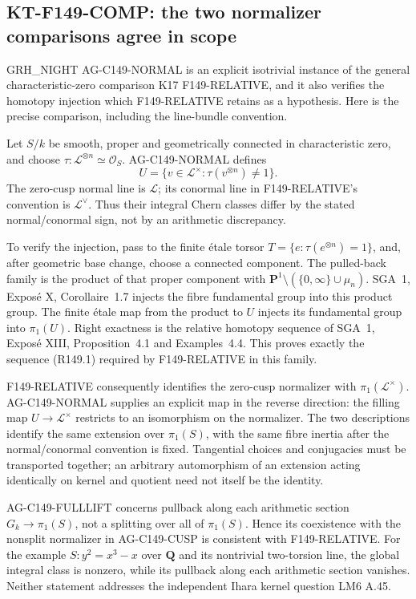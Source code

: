 \subsection{KT-F149-COMP: the two normalizer comparisons agree in scope}
\label{sec:kt-f149-comp}

GRH\_NIGHT AG-C149-NORMAL is an explicit isotrivial instance
of the general characteristic-zero comparison K17
F149-RELATIVE, and it also verifies the homotopy injection
which F149-RELATIVE retains as a hypothesis. Here is the
precise comparison, including the line-bundle convention.

Let $S/k$ be smooth, proper and geometrically connected in
characteristic zero, and choose
$\tau:\mathcal L^{\otimes n}\simeq\mathcal O_S$.
AG-C149-NORMAL defines
\[
 U=\{v\in\mathcal L^\times:
                         \tau(v^{\otimes n})\ne1\}.
\]
The zero-cusp normal line is $\mathcal L$; its conormal
line in F149-RELATIVE's convention is $\mathcal L^\vee$.
Thus their integral Chern classes differ by the stated
normal/conormal sign, not by an arithmetic discrepancy.

To verify the injection, pass to the finite \'etale torsor
$T=\{e:\tau(e^{\otimes n})=1\}$, and, after geometric
base change, choose a connected component. The pulled-back
family is the product of that proper component with
$\mathbf P^1\setminus(\{0,\infty\}\cup\mu_n)$.
SGA~1, Expos\'e X, Corollaire~1.7 injects the fibre
fundamental group into this product group. The finite
\'etale map from the product to $U$ injects its fundamental
group into $\pi_1(U)$. Right exactness is the relative
homotopy sequence of SGA~1, Expos\'e XIII, Proposition~4.1
and Examples~4.4. This proves exactly the sequence
(R149.1) required by F149-RELATIVE in this family.

F149-RELATIVE consequently identifies the zero-cusp
normalizer with $\pi_1(\mathcal L^\times)$.
AG-C149-NORMAL supplies an explicit map in the reverse
direction: the filling map $U\to\mathcal L^\times$
restricts to an isomorphism on the normalizer. The two
descriptions identify the same extension over $\pi_1(S)$,
with the same fibre inertia after the normal/conormal
convention is fixed. Tangential choices and conjugacies
must be transported together; an arbitrary automorphism
of an extension acting identically on kernel and quotient
need not itself be the identity.

AG-C149-FULLLIFT concerns pullback along each arithmetic
section $G_k\to\pi_1(S)$, not a splitting over all of
$\pi_1(S)$. Hence its coexistence with the nonsplit
normalizer in AG-C149-CUSP is consistent with
F149-RELATIVE. For the example
$S:y^2=x^3-x$ over $\mathbf Q$ and its nontrivial
two-torsion line, the global integral class is nonzero,
while its pullback along each arithmetic section vanishes.
Neither statement addresses the independent Ihara kernel
question LM6 A.45.

